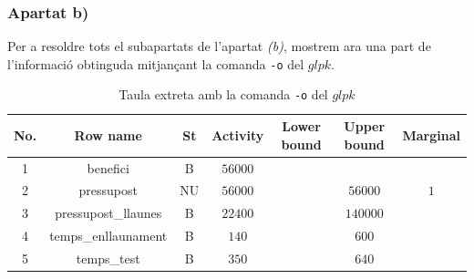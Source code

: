 \documentclass[a4paper, 11pt]{article}
\begin{document}
\subsubsection{Apartat b)}
Per a resoldre tots el subapartats de l'apartat \textit{(b)}, mostrem ara una part de l'informació obtinguda mitjançant la comanda \texttt{-o} del $glpk$.\\
\begin{table}[h]
    \centering
    \begin{tabular}{ c | c | c | c | c | c | c }
        No. & Row name & St & Activity & Lower bound & Upper bound & Marginal \\\hline\hline
        1 & benefici & B & $56000$ & & &  \\ \hline 
        2 & pressupost & NU & $56000$ & & $56000$ & $1$ \\\hline
        3 & pressupost\_llaunes & B & $22400$ & & $140000$ & \\\hline
        4 & temps\_enllaunament & B & $140$ & & $600$ & \\\hline
        5 & temps\_test & B & $350$ & & $640$ & \\
    \end{tabular}
    \caption{Taula extreta amb la comanda \texttt{-o} del $glpk$}
    \label{tab:my_label}
\end{table}
\end{document}
